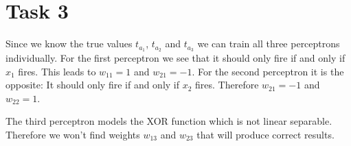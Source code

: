 \documentclass{article}
\begin{document}
	\section*{Task 3}
	Since we know the true values $t_{a_1}$, $t_{a_2}$ and $t_{a_3}$ we can train all three perceptrons individually. For the first perceptron we see that it should only fire if and only if $x_1$ fires. This leads to $w_{11} = 1$ and $w_{21} = -1$. For the second perceptron it is the opposite: It should only fire if and only if $x_2$ fires. Therefore $w_{21} = -1$ and $w_{22} = 1$.
	
	The third perceptron models the XOR function which is not linear separable. Therefore we won't find weights $w_{13}$ and $w_{23}$ that will produce correct results.
	
\end{document}
